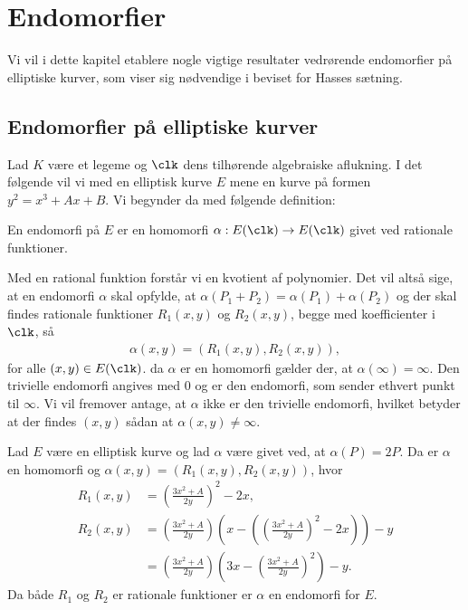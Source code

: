 \chapter{Endomorfier}
Vi vil i dette kapitel etablere nogle vigtige resultater vedrørende endomorfier på elliptiske kurver, som viser sig nødvendige i beviset for Hasses sætning.

\section{Endomorfier på elliptiske kurver}
Lad $K$ være et legeme og $\clk$ dens tilhørende algebraiske aflukning. I det følgende vil vi med en elliptisk kurve $E$ mene en kurve på formen $y^2 = x^3 + Ax + B$. 
Vi begynder da med følgende definition:

\begin{definition}
En endomorfi på $E$ er en homomorfi $\alpha : E(\clk) \to E(\clk)$ givet
ved rationale funktioner.
\end{definition}

Med en rational funktion forstår vi en kvotient af polynomier. Det vil altså sige, at 
en endomorfi $\alpha$ skal opfylde, at $\alpha(P_1 + P_2) = \alpha(P_1) + \alpha(P_2)$ 
og der skal findes rationale 
funktioner $R_1(x, y)$ og $R_2(x, y)$, begge med koefficienter i $\clk$, så
\begin{align*}
	\alpha(x, y) = (R_1(x, y), R_2(x, y)),
\end{align*}
for alle $(x, y) \in E(\clk)$. da $\alpha$ er en homomorfi gælder der, at $\alpha(\infty)=\infty$. Den trivielle endomorfi angives med $0$ og er den endomorfi, som sender ethvert punkt til $\infty$. Vi vil fremover antage, at $\alpha$ ikke er den trivielle endomorfi, hvilket betyder at der findes $(x, y)$ sådan at $\alpha(x, y) \neq \infty$.

\begin{example}
Lad $E$ være en elliptisk kurve og lad $\alpha$ være givet ved, at $\alpha(P)=2P$. Da er $\alpha$ en homomorfi og
$\alpha(x, y) = (R_1(x, y), R_2(x, y))$, hvor
\begin{align*}
	R_1(x, y) &= \left( \frac{3x^2 + A}{2y} \right)^2 - 2x, \\
	R_2(x, y) &= \left( \frac{3x^2 + A}{2y} \right) \left(x - \left( \left( \frac{3x^2 + A}{2y} \right)^2 - 
	2x \right) \right) - y \\
	&= \left( \frac{3x^2 + A}{2y} \right) \left(3x - \left( \frac{3x^2 + A}{2y} \right)^2 \right) - y.
\end{align*}
Da både $R_1$ og $R_2$ er rationale funktioner er $\alpha$ en endomorfi for $E$.
\end{example}


